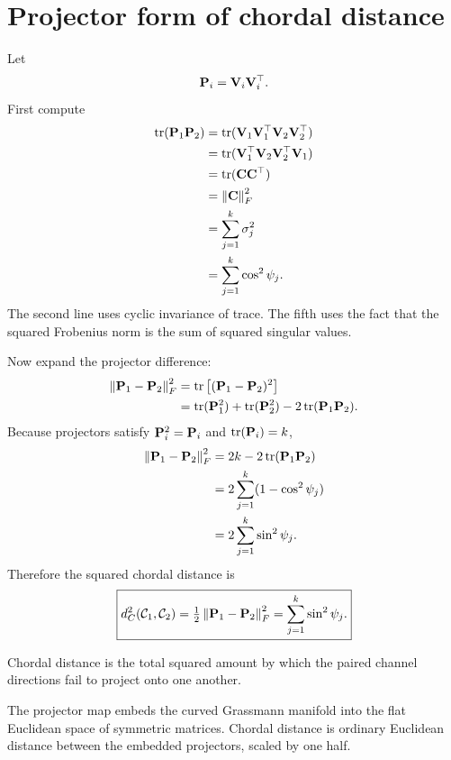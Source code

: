 \section{Projector form of chordal distance}

Let
\begin{equation}
\mathbf{P}_i=\mathbf{V}_i\mathbf{V}_i^\top.
\end{equation}
First compute
\begin{align}
\operatorname{tr}(\mathbf{P}_1\mathbf{P}_2)
&=\operatorname{tr}(\mathbf{V}_1\mathbf{V}_1^\top\mathbf{V}_2\mathbf{V}_2^\top)\\
&=\operatorname{tr}(\mathbf{V}_1^\top\mathbf{V}_2\mathbf{V}_2^\top\mathbf{V}_1)\\
&=\operatorname{tr}(\mathbf C\mathbf C^\top)\\
&=\left\lVert \mathbf C\right\rVert_F^2\\
&=\sum_{j=1}^k\sigma_j^2\\
&=\sum_{j=1}^k\cos^2\psi_j.
\label{eq:traceProjectorOverlap}
\end{align}
The second line uses cyclic invariance of trace. The fifth uses the fact that the squared Frobenius norm is the sum of squared singular values.

Now expand the projector difference:
\begin{align}
\left\lVert \mathbf{P}_1-\mathbf{P}_2\right\rVert_F^2
&=\operatorname{tr}\left[(\mathbf{P}_1-\mathbf{P}_2)^2\right]\\
&=\operatorname{tr}(\mathbf{P}_1^2)+\operatorname{tr}(\mathbf{P}_2^2)-2\operatorname{tr}(\mathbf{P}_1\mathbf{P}_2).
\end{align}
Because projectors satisfy \(\mathbf{P}_i^2=\mathbf{P}_i\) and \(\operatorname{tr}(\mathbf{P}_i)=k\),
\begin{align}
\left\lVert \mathbf{P}_1-\mathbf{P}_2\right\rVert_F^2
&=2k-2\operatorname{tr}(\mathbf{P}_1\mathbf{P}_2)\\
&=2\sum_{j=1}^k(1-\cos^2\psi_j)\\
&=2\sum_{j=1}^k\sin^2\psi_j.
\end{align}
Therefore the squared chordal distance is
\begin{equation}
\boxed{
d_C^2(\mathcal C_1,\mathcal C_2)
=\tfrac12\left\lVert \mathbf{P}_1-\mathbf{P}_2\right\rVert_F^2
=\sum_{j=1}^k\sin^2\psi_j.}
\label{eq:chordalIdentity}
\end{equation}

\inwords Chordal distance is the total squared amount by which the paired channel directions fail to project onto one another.

\begin{geombox}
The projector map embeds the curved Grassmann manifold into the flat Euclidean space of symmetric matrices. Chordal distance is ordinary Euclidean distance between the embedded projectors, scaled by one half.
\end{geombox}

